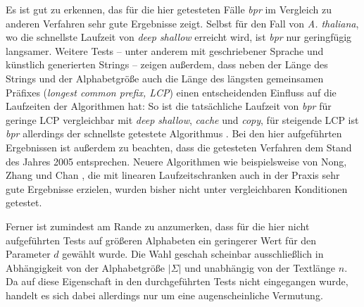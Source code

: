 Es ist gut zu erkennen, das für die hier getesteten Fälle \emph{bpr} im Vergleich zu anderen Verfahren sehr gute Ergebnisse zeigt. Selbst für den Fall von \emph{A. thaliana}, wo die schnellste Laufzeit von \emph{deep shallow} erreicht wird, ist \emph{bpr} nur geringfügig langsamer. Weitere Tests -- unter anderem mit geschriebener Sprache und künstlich generierten Strings -- zeigen außerdem, dass neben der Länge des Strings und der Alphabetgröße auch die Länge des längsten gemeinsamen Präfixes (\emph{longest common prefix, LCP}) einen entscheidenden Einfluss auf die Laufzeiten der Algorithmen hat: So ist die tatsächliche Laufzeit von \emph{bpr} für geringe LCP vergleichbar mit \emph{deep shallow}, \emph{cache} und \emph{copy}, für steigende LCP ist \emph{bpr} allerdings der schnellste getestete Algorithmus \cite[Kapitel~4]{saca:2}. Bei den hier aufgeführten Ergebnissen ist außerdem zu beachten, dass die getesteten Verfahren dem Stand des Jahres 2005 entsprechen. Neuere Algorithmen wie beispielsweise von Nong, Zhang und Chan \cite{saca:6}, die mit linearen Laufzeitschranken auch in der Praxis sehr gute Ergebnisse erzielen, wurden bisher nicht unter vergleichbaren Konditionen getestet.\par\smallskip
Ferner ist zumindest am Rande zu anzumerken, dass für die hier nicht aufgeführten Tests auf größeren Alphabeten ein geringerer Wert für den Parameter \(d\) gewählt wurde. Die Wahl geschah scheinbar ausschließlich in Abhängigkeit von der Alphabetgröße \(|\Sigma|\) und unabhängig von der Textlänge \(n\). Da auf diese Eigenschaft in den durchgeführten Tests nicht eingegangen wurde, handelt es sich dabei allerdings nur um eine augenscheinliche Vermutung.
